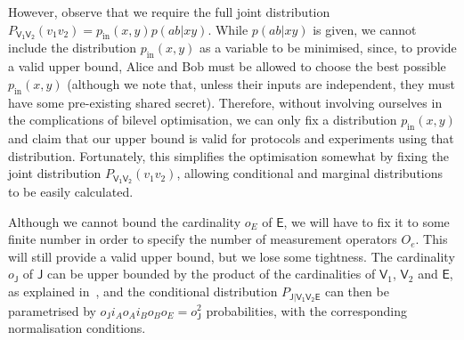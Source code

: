 \documentclass[10pt, a4paper]{article}
\numberwithin{equation}{section} %
\theoremstyle{definition}
\theoremstyle{plain}
\newcommand{\?}{\mathrel{?}} %
\newcommand{\crv}[1]{\mathsf{#1}}
\newcommand{\prin}[1][p]{#1_{\mathrm{in}}}
\begin{document}
                  However, observe that we require the full joint distribution \(P_{\crv{V_1V_2}}(v_1v_2) = \prin(x,y)p(ab|xy)\). While \(p(ab|xy)\) is given, we cannot include the distribution \(\prin(x,y)\) as a variable to be minimised, since, to provide a valid upper bound, Alice and Bob must be allowed to choose the best possible \(\prin(x,y)\) (although we note that, unless their inputs are independent, they must have some pre-existing shared secret). Therefore, without involving ourselves in the complications of bilevel optimisation, we can only fix a distribution \(\prin(x,y)\) and claim that our upper bound is valid for protocols and experiments using that distribution. Fortunately, this simplifies the optimisation somewhat by fixing the joint distribution \(P_{\crv{V_1V_2}}(v_1v_2)\), allowing conditional and marginal distributions to be easily calculated.

                  Although we cannot bound the cardinality \(o_E\) of \(\crv{E}\), we will have to fix it to some finite number in order to specify the number of measurement operators \(O_e\). This will still provide a valid upper bound, but we lose some tightness. The cardinality \(o_{\crv{J}}\) of \(\crv{J}\) can be upper bounded by the product of the cardinalities of \(\crv{V}_1\), \(\crv{V}_2\) and \(\crv{E}\), as explained in~\cite[Cor. 2 Proof]{ClassicalUpperBounds}, and the conditional distribution \(P_{\crv{J|V_1V_2E}}\) can then be parametrised by \(o_{\crv{J}} i_A o_A i_B o_B o_E = o_{\crv{J}}^2\) probabilities, with the corresponding normalisation conditions.
\end{document}
